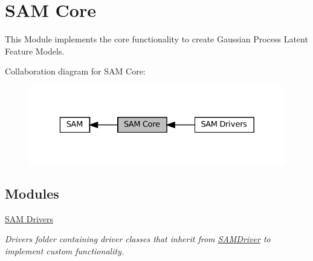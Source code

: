 \hypertarget{group__icubclient__SAM__Core}{}\section{S\+AM Core}
\label{group__icubclient__SAM__Core}


This Module implements the core functionality to create Gaussian Process Latent Feature Models.  


Collaboration diagram for S\+AM Core\+:
\nopagebreak
\begin{figure}[H]
\begin{center}
\leavevmode
\includegraphics[width=329pt]{group__icubclient__SAM__Core}
\end{center}
\end{figure}
\subsection*{Modules}
\begin{DoxyCompactItemize}
\item 
\hyperlink{group__icubclient__SAM__Drivers}{S\+A\+M Drivers}
\begin{DoxyCompactList}\small\item\em Drivers folder containing driver classes that inherit from \hyperlink{group__icubclient__SAM__Drivers_classSAM_1_1SAM__Core_1_1SAMDriver_1_1SAMDriver}{S\+A\+M\+Driver} to implement custom functionality. \end{DoxyCompactList}\end{DoxyCompactItemize}
